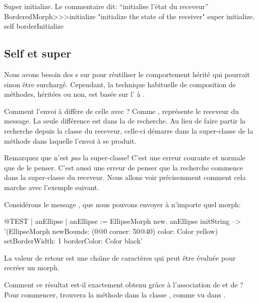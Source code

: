 \documentclass[a4paper,10pt,twoside]{book}
\begin{document}
\begin{method}[morphinit]{Super initialize. Le commentaire dit: ``initialise l'\'etat du receveur''}
BorderedMorph>>>initialize
	"initialize the state of the receiver"
	super initialize.
	self borderInitialize
\end{method}


\subsection{Self et super}

Nous avons besoin des s sur \super pour 
r\'eutiliser le comportement h\'erit\'e qui pourrait sinon \^etre
surcharg\'e.
Cependant, la technique habituelle de composition de m\'ethodes,
h\'erit\'ees ou non, est bas\'ee sur l' \`a
\self.

Comment l'envoi \`a \self diff\`ere de celle avec \super?
Comme \self, \super repr\'esente le receveur du message.
La seule diff\'erence est dans la  de recherche.
Au lieu de faire partir la recherche depuis la classe du receveur,
celle-ci d\'emarre dans la super-classe de la m\'ethode dans laquelle
l'envoi \`a \super se produit. 

Remarquez que \super n'est \emph{pas} la super-classe!
C'est une erreur courante et normale que de le penser.
C'est aussi une erreur de penser que la recherche commence dans la super-classe du receveur.
Nous allons voir pr\'ecisemment comment cela marche avec l'exemple suivant.

Consid\'erons le message , que nous pouvons envoyer \`a 
n'importe quel morph:
\begin{code}{@TEST | anEllipse | anEllipse := EllipseMorph new.}
anEllipse initString --> '(EllipseMorph newBounds: (0@0 corner: 50@40) color: Color yellow) setBorderWidth: 1 borderColor: Color black'
\end{code}
La valeur de retour est une cha\^{\i}ne de caract\`eres qui peut \^etre
\'evalu\'ee pour recr\'eer un morph.

Comment ce r\'esultat est-il exactement obtenu gr\^ace \`a l'association
de \self et de \super?
Pour commencer, 
 trouvera la m\'ethode  dans la 
classe ,
comme vu dans .
\end{document}
